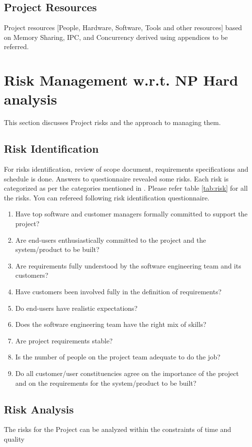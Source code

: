 \documentclass[oneside,a4paper,12pt]{report}
\begin{document}
\subsection{Project Resources}
          Project resources  [People, Hardware, Software, Tools and other resources] based on Memory Sharing, IPC, and Concurrency derived using appendices to be referred. 

\section{Risk Management w.r.t. NP Hard analysis}
This section discusses Project risks and the approach to managing them.
\subsection{Risk Identification}
For risks identification, review of scope document, requirements specifications and schedule is done. Answers to questionnaire revealed some risks. Each risk is categorized as per the categories mentioned in \cite{bookPressman}. Please refer table \ref{tab:risk} for all the risks. You can refereed following risk identification questionnaire.

\begin{enumerate}
\item Have top software and customer managers formally committed to support the project?
\item Are end-users enthusiastically committed to the project and the system/product to be built?
\item Are requirements fully understood by the software engineering team and its customers?
\item Have customers been involved fully in the definition of requirements?
\item Do end-users have realistic expectations?
\item Does the software engineering team have the right mix of skills?
\item Are project requirements stable?
\item Is the number of people on the project team adequate to do the job?
\item Do all customer/user constituencies agree on the importance of the project and on the requirements for the system/product to be built?
\end{enumerate}

\subsection{Risk Analysis}
The risks for the Project can be analyzed within the constraints of time and quality
\end{document}
